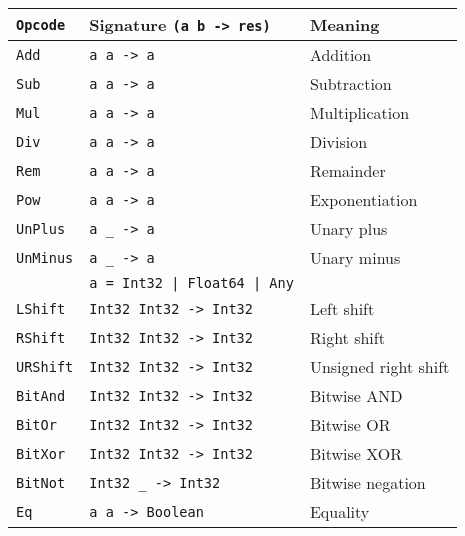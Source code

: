\begin{table}
    \centering
    \begin{tabular}{l | l | l}
        \texttt{Opcode}      & Signature \texttt{(a b -> res)}    &  Meaning                    \\\hline
        \texttt{Add}         & \texttt{a      a     -> a        } &  Addition                   \\
        \texttt{Sub}         & \texttt{a      a     -> a        } &  Subtraction                \\
        \texttt{Mul}         & \texttt{a      a     -> a        } &  Multiplication             \\
        \texttt{Div}         & \texttt{a      a     -> a        } &  Division                   \\
        \texttt{Rem}         & \texttt{a      a     -> a        } &  Remainder                  \\
        \texttt{Pow}         & \texttt{a      a     -> a        } &  Exponentiation             \\
        \texttt{UnPlus}      & \texttt{a      \_    -> a        } &  Unary plus                 \\
        \texttt{UnMinus}     & \texttt{a      \_    -> a        } &  Unary minus                \\
                             & \texttt{a = Int32 | Float64 | Any} &                             \\\hline
        \texttt{LShift}      & \texttt{Int32  Int32 -> Int32    } &  Left shift                 \\
        \texttt{RShift}      & \texttt{Int32  Int32 -> Int32    } &  Right shift                \\
        \texttt{URShift}     & \texttt{Int32  Int32 -> Int32    } &  Unsigned right shift       \\
        \texttt{BitAnd}      & \texttt{Int32  Int32 -> Int32    } &  Bitwise AND                \\
        \texttt{BitOr}       & \texttt{Int32  Int32 -> Int32    } &  Bitwise OR                 \\
        \texttt{BitXor}      & \texttt{Int32  Int32 -> Int32    } &  Bitwise XOR                \\
        \texttt{BitNot}      & \texttt{Int32  \_    -> Int32    } &  Bitwise negation           \\\hline
        \texttt{Eq}          & \texttt{a      a     -> Boolean  } &  Equality                   \\

\end{tabular}
\end{table}
